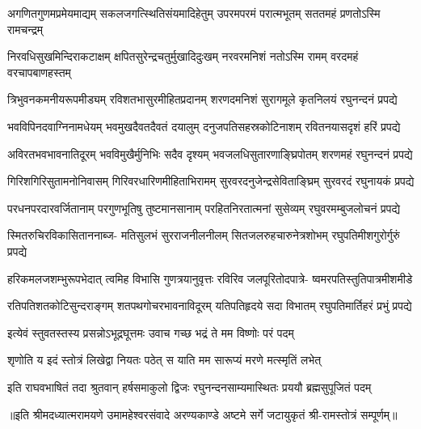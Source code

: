 


\addtocounter{shlokacount}{43}

\fourlineindentedshloka
{अगणितगुणमप्रमेयमाद्यम्}
{सकलजगत्स्थितिसंयमादिहेतुम्}
{उपरमपरमं परात्मभूतम्}
{सततमहं प्रणतोऽस्मि रामचन्द्रम्} %

\fourlineindentedshloka
{निरवधिसुखमिन्दिराकटाक्षम्}
{क्षपितसुरेन्द्रचतुर्मुखादिदुःखम्}
{नरवरमनिशं नतोऽस्मि रामम्}
{वरदमहं वरचापबाणहस्तम्} %

\fourlineindentedshloka
{त्रिभुवनकमनीयरूपमीड्यम्}
{रविशतभासुरमीहितप्रदानम्}
{शरणदमनिशं सुरागमूले}
{कृतनिलयं रघुनन्दनं प्रपद्ये} %

\fourlineindentedshloka
{भवविपिनदवाग्निनामधेयम्}
{भवमुखदैवतदैवतं दयालुम्}
{दनुजपतिसहस्रकोटिनाशम्}
{रवितनयासदृशं हरिं प्रपद्ये} %

\fourlineindentedshloka
{अविरतभवभावनातिदूरम्}
{भवविमुखैर्मुनिभिः सदैव दृश्यम्}
{भवजलधिसुतारणाङ्घ्रिपोतम्}
{शरणमहं रघुनन्दनं प्रपद्ये} %

\fourlineindentedshloka
{गिरिशगिरिसुतामनोनिवासम्}
{गिरिवरधारिणमीहिताभिरामम्}
{सुरवरदनुजेन्द्रसेविताङ्घ्रिम्}
{सुरवरदं रघुनायकं प्रपद्ये} %

\fourlineindentedshloka
{परधनपरदारवर्जितानाम्}
{परगुणभूतिषु तुष्टमानसानाम्}
{परहितनिरतात्मनां सुसेव्यम्}
{रघुवरमम्बुजलोचनं प्रपद्ये} %

\fourlineindentedshloka
{स्मितरुचिरविकासिताननाब्ज-}
{मतिसुलभं सुरराजनीलनीलम्}
{सितजलरुहचारुनेत्रशोभम्}
{रघुपतिमीशगुरोर्गुरुं प्रपद्ये} %

\fourlineindentedshloka
{हरिकमलजशम्भुरूपभेदात्}
{त्वमिह विभासि गुणत्रयानुवृत्तः}
{रविरिव जलपूरितोदपात्रे-}
{ष्वमरपतिस्तुतिपात्रमीशमीडे} %

\fourlineindentedshloka
{रतिपतिशतकोटिसुन्दराङ्गम्}
{शतपथगोचरभावनाविदूरम्}
{यतिपतिहृदये सदा विभातम्}
{रघुपतिमार्तिहरं प्रभुं प्रपद्ये} %

\twolineshloka
{इत्येवं स्तुवतस्तस्य प्रसन्नोऽभूद्रघूत्तमः}
{उवाच गच्छ भद्रं ते मम विष्णोः परं पदम्} %

\twolineshloka
{शृणोति य इदं स्तोत्रं लिखेद्वा नियतः पठेत्}
{स याति मम सारूप्यं मरणे मत्स्मृतिं लभेत्} %

\fourlineindentedshloka
{इति राघवभाषितं तदा}
{श्रुतवान् हर्षसमाकुलो द्विजः}
{रघुनन्दनसाम्यमास्थितः}
{प्रययौ ब्रह्मसुपूजितं पदम्} %

{॥इति श्रीमदध्यात्मरामयणे उमामहेश्वरसंवादे
अरण्यकाण्डे अष्टमे  सर्गे  जटायुकृतं  श्री-रामस्तोत्रं  सम्पूर्णम्॥}
